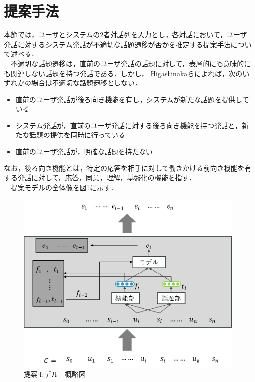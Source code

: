\documentclass[upLaTex, 10pt,dvipdfmx,a4paper,twocolumn]{jsarticle}
\begin{document}
\section{提案手法}
    本節では，ユーザとシステムの2者対話列を入力とし，各対話において，ユーザ発話に対するシステム発話が不適切な話題遷移が否かを推定する提案手法について述べる．\\
    　不適切な話題遷移は，直前のユーザ発話の話題に対して，表層的にも意味的にも関連しない話題を持つ発話である．しかし， Higashinakaらによれば，次のいずれかの場合は不適切な話題遷移としない．
    \begin{itemize}
        \item 直前のユーザ発話が後ろ向き機能を有し，システムが新たな話題を提供している
        \item システム発話が，直前のユーザ発話に対する後ろ向き機能を持つ発話と，新たな話題の提供を同時に行っている
        \item 直前のユーザ発話が，明確な話題を持たない
    \end{itemize}

    なお，後ろ向き機能とは，特定の応答を相手に対して働きかける前向き機能を有する発話に対して，応答，同意，理解，基盤化の機能を指す．\\
    　提案モデルの全体像を図\ref{fig:all}に示す．

    \begin{figure}[htb]
        \includegraphics[keepaspectratio, scale=0.6]{ img/all.png }
        \caption{提案モデル　概略図}
        \label{fig:all}
    \end{figure}
\end{document}

